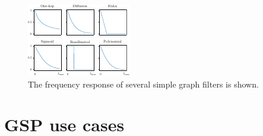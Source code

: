 \begin{figure}[t]
	\centering
		\includegraphics[width=0.7\linewidth]{Figures/filters_plot.pdf}
        \caption[The frequency response of some simple graphs filters]{The frequency response of several simple graph filters is shown. }
	\label{fig:filters_plot}
\end{figure}






\newpage

\section{GSP use cases}

